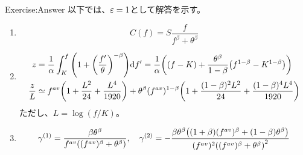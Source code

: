 \documentclass[dvipdfmx,9pt]{beamer}
\begin{document}
\begin{frame}{Exercise:Answer}
  以下では、$\varepsilon = 1$として解答を示す。
  \begin{enumerate}
    \item
          \begin{equation}
            C(f) =  S\frac{f}{f^{\beta} + \theta^{\beta}}
          \end{equation}
    \item
          \begin{align}
            z           & = \frac{1}{\alpha}\int_{K}^{f} \pqty{1 + \pqty{\frac{f'}{\theta}}^{-\beta}} \dd f'
            = \frac{1}{\alpha} \pqty{\pqty{f-K} + \frac{\theta^{\beta}}{1-\beta}\pqty{f^{1-\beta} - K^{1-\beta}}}                                                                                    \\
            \frac{z}{L} & \simeq f^{av}\pqty{1 + \frac{L^{2}}{24} + \frac{L^{4}}{1920}} + \theta^{\beta}(f^{av})^{1-\beta}\pqty{1 + \frac{(1-\beta)^{2}L^{2}}{24} + \frac{(1-\beta)^{4}L^{4}}{1920}}
          \end{align}
          ただし、$L = \log(f/K)$。
    \item
          \begin{equation}
            \gamma^{(1)}=\frac{\beta \theta^{\beta}}{f^{av}\pqty{(f^{av})^{\beta} + \theta^{\beta}}}, \quad
            \gamma^{(2)}=-\frac{\beta \theta^{\beta}\pqty{(1+\beta)(f^{av})^{\beta} + (1-\beta)\theta^{\beta}}}{(f^{av})^{2}\pqty{(f^{av})^{\beta} + \theta^{\beta}}^{2}}
          \end{equation}
  \end{enumerate}
\end{frame}
\end{document}
